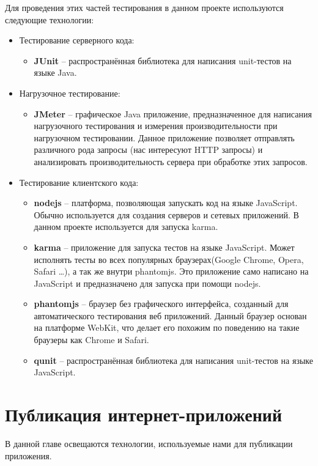 	Для проведения этих частей тестирования в данном проекте используются следующие технологии:
	\begin{itemize}
\item Тестирование серверного кода:
	\begin{itemize}
		\item \textbf{JUnit} -- распространённая библиотека для написания unit-тестов на языке Java.
	\end{itemize}
\item Нагрузочное тестирование:
	\begin{itemize}
		\item \textbf{JMeter} -- графическое Java приложение, предназначенное для написания нагрузочного тестирования и измерения производительности при нагрузочном тестировании. Данное приложение позволяет отправлять различного рода запросы (нас интересуют HTTP запросы) и анализировать производительность сервера при обработке этих запросов.
	\end{itemize}
\item Тестирование клиентского кода:
\begin{itemize}
	\item \textbf{nodejs} -- платформа, позволяющая запускать код на языке JavaScript. Обычно используется для создания серверов и сетевых приложений. В данном проекте используется для запуска karma.
	\item \textbf{karma} -- приложение для запуска тестов на языке JavaScript. Может исполнять тесты во всех популярных браузерах(Google Chrome, Opera, Safari \dots), а так же внутри phantomjs. Это приложение само написано на JavaScript и предназначено для запуска при помощи nodejs.
	\item \textbf{phantomjs} -- браузер без графического интерфейса, созданный для автоматического тестирования веб приложений. Данный браузер основан на платформе WebKit, что делает его похожим по поведению на такие браузеры как Chrome и Safari.
	\item \textbf{qunit} -- распространённая библиотека для написания unit-тестов на языке JavaScript.
\end{itemize}
\end{itemize}

\section{Публикация интернет-приложений}
В данной главе освещаются технологии, используемые нами для публикации приложения.
